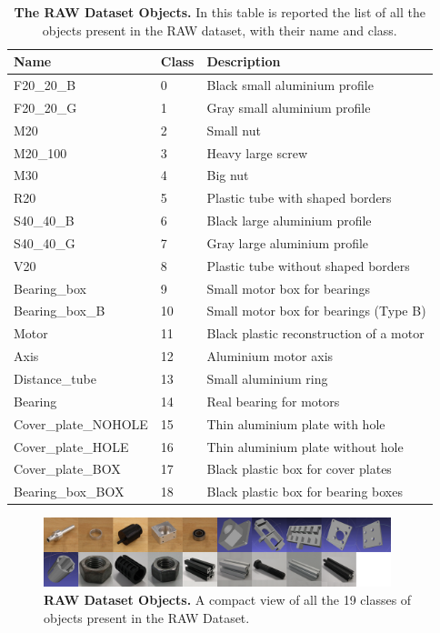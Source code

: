 \begin{table}
    \centering
    \begin{tabular}{| l | l | l |}
    \hline
    \textbf{Name} & \textbf{Class} & \textbf{Description} \\ \hline
    F20\_20\_B & 0 & Black small aluminium profile \\
    F20\_20\_G & 1 & Gray small aluminium profile \\
    M20 & 2 & Small nut \\
    M20\_100 & 3 & Heavy large screw \\
    M30 & 4 & Big nut \\
    R20 & 5 & Plastic tube with shaped borders \\
    S40\_40\_B & 6 & Black large aluminium profile \\
    S40\_40\_G & 7 & Gray large aluminium profile \\
    V20 & 8 & Plastic tube without shaped borders \\
    Bearing\_box & 9 & Small motor box for bearings \\
    Bearing\_box\_B & 10 & Small motor box for bearings (Type B) \\
    Motor & 11 & Black plastic reconstruction of a motor \\
    Axis & 12 & Aluminium motor axis \\
    Distance\_tube & 13 & Small aluminium ring \\
    Bearing & 14 & Real bearing for motors \\
    Cover\_plate\_NOHOLE & 15 & Thin aluminium plate with hole \\
    Cover\_plate\_HOLE & 16 & Thin aluminium plate without hole \\
    Cover\_plate\_BOX & 17 & Black plastic box for cover plates \\
    Bearing\_box\_BOX & 18 & Black plastic box for bearing boxes \\
    \hline
    \end{tabular}
    \caption{\textbf{The RAW Dataset Objects.} In this table is reported the list of all the objects present in the RAW dataset, with their name and class.}
    \label{tab:raw_objs_list}
\end{table}

\begin{figure}
    \centering
    \includegraphics[width=0.9\textwidth]{figures/3_raw_dataset/raw_obj_examples}
    \caption{\textbf{RAW Dataset Objects.} A compact view of all the 19 classes of objects present in the RAW Dataset.}
    \label{fig:raw_obj_examples}
\end{figure}

